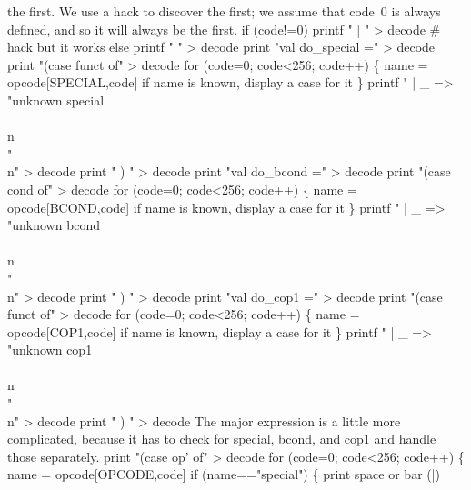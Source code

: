 the first.
We use a hack to discover the first; we assume that code~0 is always
defined, and so it will always be the first.
\enddocs
{}
\endmoddef
if (code!=0) printf " | "  > decode # hack but it works
else printf "   " > decode
\endcode
{}
\endmoddef
print "val do_special ="  > decode
print "(case funct of" > decode
for (code=0; code<256; code++) \{
        name = opcode[SPECIAL,code]
        \LA{}if \code{}name\edoc{} is known, display a case for it\RA{}
\}
printf " | _ => \\"unknown special\\\\n\\"\\n" > decode
print "   ) " > decode
\endcode
{}
\endmoddef
print "val do_bcond =" > decode
print "(case cond of" > decode
for (code=0; code<256; code++) \{
        name = opcode[BCOND,code]
        \LA{}if \code{}name\edoc{} is known, display a case for it\RA{}
\}
printf " | _ => \\"unknown bcond\\\\n\\"\\n" > decode
print "   ) " > decode
\endcode
{}
\endmoddef
print "val do_cop1 =" > decode
print "(case funct of" > decode
for (code=0; code<256; code++) \{
        name = opcode[COP1,code]
        \LA{}if \code{}name\edoc{} is known, display a case for it\RA{}
\}
printf " | _ => \\"unknown cop1\\\\n\\"\\n" > decode
print "   ) " > decode
\endcode
{}
The major expression is a little more complicated, because it has to
check for \code{}special\edoc{}, \code{}bcond\edoc{}, and \code{}cop1\edoc{} and handle those separately.
\enddocs
{}
\endmoddef
print "(case op' of" > decode
for (code=0; code<256; code++) \{
        name = opcode[OPCODE,code]
        if (name=="special") \{
                \LA{}print space or bar (\code{}|\edoc{})\RA{}

